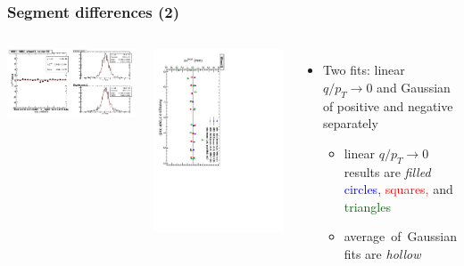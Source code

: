 \documentclass[compress]{beamer}
\begin{document}
\begin{frame}
\frametitle{Segment differences (2)}

\begin{columns}
\includegraphics[width=\linewidth]{NOV4_segdiffs/dt13_resid_C_05_12.png}

\includegraphics[height=\linewidth, angle=90]{NOV4_segdiff_x_whze.pdf}
\begin{itemize}
\item Two fits: linear $q/p_T \to 0$ and Gaussian of positive and
  negative separately
\begin{itemize}
\item linear $q/p_T \to 0$ results are {\it filled} \textcolor{blue}{circles,} \textcolor{red}{squares,} and \textcolor{darkgreen}{triangles}
\item \mbox{average of Gaussian\hspace{-1 cm}} \\ fits are {\it hollow}
\end{itemize}


\end{itemize}
\end{columns}
\end{frame}
\end{document}
